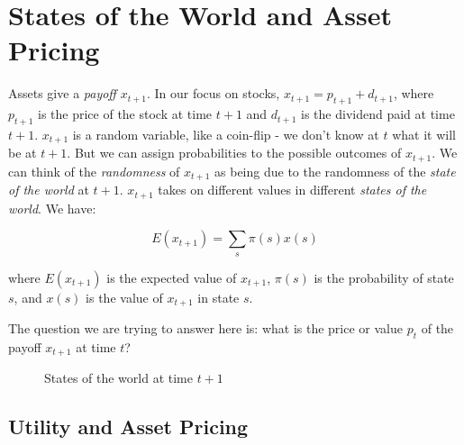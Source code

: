 \chapter{States of the World and Asset Pricing}

Assets give a \textit{payoff} $x_{t+1}$. In our focus on stocks, 
$x_{t+1} = p_{t+1} + d_{t+1}$, where $p_{t+1}$ is the 
price of the stock at time $t+1$ and $d_{t+1}$ 
is the dividend paid at time $t+1$.
$x_{t+1}$ is a random variable, like a coin-flip - we don't 
know at $t$ what it will be at $t+1$. But we can assign 
probabilities to the possible outcomes of $x_{t+1}$.
We can think of the \textit{randomness} of $x_{t+1}$ as being
due to the randomness of the \textit{state of the world} at $t+1$.
$x_{t+1}$ takes on different values in 
different \textit{states of the world}.
We have:

\begin{equation}
    E(x_{t+1}) = \sum_s \pi(s) x(s)
\end{equation}

where $E(x_{t+1})$ is the expected value of $x_{t+1}$,
$\pi(s)$ is the probability of state $s$, and $x(s)$ is the
value of $x_{t+1}$ in state $s$.

The question we are trying to answer here is: what is the price 
or value $p_t$ of the payoff $x_{t+1}$ at time $t$?

\begin{figure}[htbp]
    \centering
{}
    \caption{States of the world at time \(t+1\)}
    \label{fig:states_of_the_world}
\end{figure}

\section{Utility and Asset Pricing}


